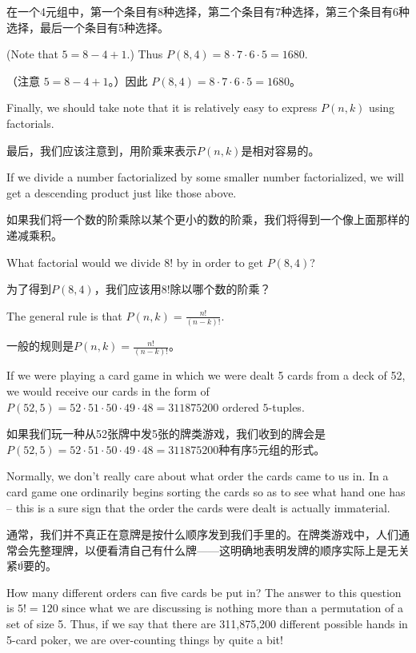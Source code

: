 在一个4元组中，第一个条目有8种选择，第二个条目有7种选择，第三个条目有6种选择，最后一个条目有5种选择。

(Note that $5 = 8-4+1$.)  Thus $P(8,4)=8\cdot 7 \cdot 6 \cdot 5 = 1680$.

（注意 $5 = 8-4+1$。）因此 $P(8,4)=8\cdot 7 \cdot 6 \cdot 5 = 1680$。

Finally, we should take note that it is relatively easy to express $P(n,k)$
using factorials.

最后，我们应该注意到，用阶乘来表示$P(n,k)$是相对容易的。

If we divide a number factorialized by some smaller 
number factorialized, we will get a descending product just like those above.

如果我们将一个数的阶乘除以某个更小的数的阶乘，我们将得到一个像上面那样的递减乘积。

\begin{exer}
What factorial would we divide $8!$ by in order to get $P(8,4)$?
\end{exer}

\begin{exer}
为了得到$P(8,4)$，我们应该用$8!$除以哪个数的阶乘？
\end{exer}

The general rule is that $P(n,k) = \frac{n!}{(n-k)!}$.

一般的规则是$P(n,k) = \frac{n!}{(n-k)!}$。

If we were playing a card game in which we were dealt 5 cards from
a deck of 52, we would receive our cards in the form of 
$P(52,5) = 52 \cdot 51 \cdot 50 \cdot 49 \cdot 48 = 311875200$ ordered
$5$-tuples.

如果我们玩一种从52张牌中发5张的牌类游戏，我们收到的牌会是$P(52,5) = 52 \cdot 51 \cdot 50 \cdot 49 \cdot 48 = 311875200$种有序5元组的形式。

Normally, we don't really care about what order the cards
came to us in.  In a card game one ordinarily begins sorting the cards
so as to see what hand one has -- this is a sure sign that the order the
cards were dealt is actually immaterial.

通常，我们并不真正在意牌是按什么顺序发到我们手里的。在牌类游戏中，人们通常会先整理牌，以便看清自己有什么牌——这明确地表明发牌的顺序实际上是无关紧ย์要的。

How many different orders can
five cards be put in?  The answer to this question is $5! = 120$ since
what we are discussing is nothing more than a permutation of a set of
size 5.  Thus, if we say that there are 311,875,200 different possible 
hands in 5-card poker, we are over-counting things by quite a bit!

